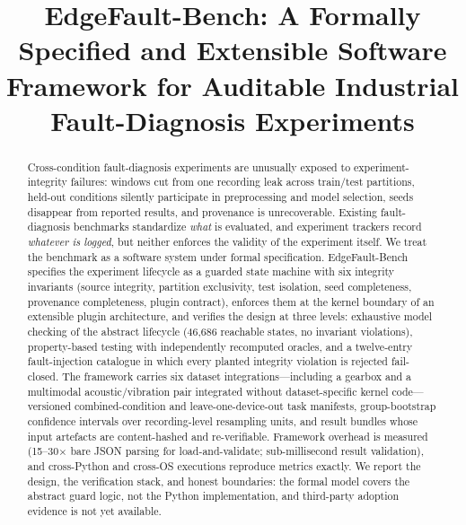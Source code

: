 \documentclass[acmsmall,review,anonymous]{acmart}
\begin{document}
\title{EdgeFault-Bench: A Formally Specified and Extensible Software Framework
for Auditable Industrial Fault-Diagnosis Experiments}


\begin{abstract}
Cross-condition fault-diagnosis experiments are unusually exposed to
experiment-integrity failures: windows cut from one recording leak across
train/test partitions, held-out conditions silently participate in
preprocessing and model selection, seeds disappear from reported results, and
provenance is unrecoverable. Existing fault-diagnosis benchmarks standardize
\emph{what} is evaluated, and experiment trackers record \emph{whatever is
logged}, but neither enforces the validity of the experiment itself. We treat
the benchmark as a software system under formal specification. EdgeFault-Bench
specifies the experiment lifecycle as a guarded state machine with six
integrity invariants (source integrity, partition exclusivity, test isolation,
seed completeness, provenance completeness, plugin contract), enforces them at
the kernel boundary of an extensible plugin architecture, and verifies the
design at three levels: exhaustive model checking of the abstract lifecycle
(46{,}686 reachable states, no invariant violations), property-based testing
with independently recomputed oracles, and a twelve-entry fault-injection
catalogue in which every planted integrity violation is rejected fail-closed.
The framework carries six dataset integrations---including a gearbox and a
multimodal acoustic/vibration pair integrated without dataset-specific kernel
code---versioned combined-condition and leave-one-device-out task manifests,
group-bootstrap confidence intervals over recording-level resampling units,
and result bundles whose input artefacts are content-hashed and re-verifiable.
Framework overhead is measured (15--30$\times$ bare JSON parsing for
load-and-validate; sub-millisecond result validation), and cross-Python and
cross-OS executions reproduce metrics exactly. We report the design, the
verification stack, and honest boundaries: the formal model covers the
abstract guard logic, not the Python implementation, and third-party adoption
evidence is not yet available.
\end{abstract}

\end{document}
